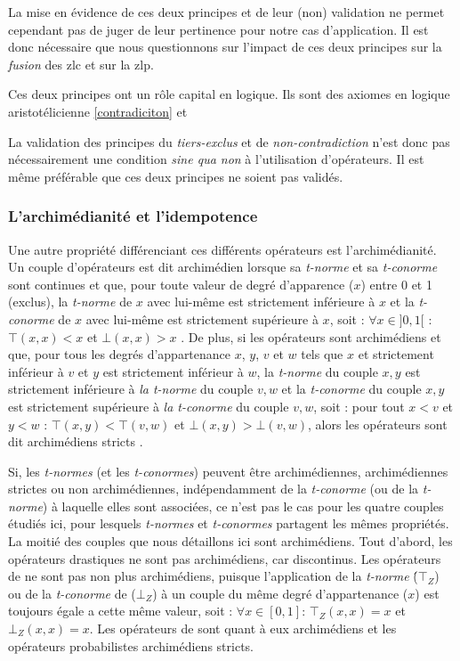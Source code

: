 La mise en évidence de ces deux principes et de leur (non) validation
ne permet cependant pas de juger de leur pertinence pour notre cas
d’application. Il est donc nécessaire que nous questionnons sur
l'impact de ces deux principes sur la \emph{fusion} des \ac{zlc} et
sur la \ac{zlp}.

Ces deux principes ont un rôle capital en logique. Ils sont des
axiomes en logique aristotélicienne \autoref{contradiciton} et 

La validation des principes du \emph{tiers-exclus} et de
\emph{non-contradiction} n'est donc pas nécessairement une condition
\emph{sine qua non} à l'utilisation d'opérateurs. Il est même
préférable que ces deux principes ne soient pas validés.

\subsubsection{L'archimédianité et l’idempotence}

Une autre propriété différenciant ces différents opérateurs est
l'archimédianité. Un couple d'opérateurs est dit archimédien lorsque
sa \emph{t-norme} et sa \emph{t-conorme} sont continues et que, pour
toute valeur de degré d’apparence (\(x\)) entre 0 et 1 (exclus), la
\emph{t-norme} de \(x\) avec lui-même est strictement inférieure à
\(x\) et la \emph{t-conorme} de \(x\) avec lui-même est strictement
supérieure à \(x\), soit : \(\forall x \in ]0,1[\) : \(⊤(x,x) < x\) et
\(⊥(x,x) > x\) \autocite{Bouchon-Meunier1995}. De plus, si les
opérateurs sont archimédiens et que, pour tous les degrés
d'appartenance \(x\), \(y\), \(v\) et \(w\) tels que \(x\) et
strictement inférieur à \(v\) et \(y\) est strictement inférieur à
\(w\), la \emph{t-norme} du couple \(x,y\) est strictement inférieure
à \emph{la t-norme} du couple \(v, w\) et la \emph{t-conorme} du
couple \(x,y\) est strictement supérieure à \emph{la t-conorme} du
couple \(v, w\), soit : pour tout \(x < v\) et \(y < w\) :
\(⊤(x,y) < ⊤(v,w)\) et \(⊥(x,y) > ⊥(v,w)\), alors les opérateurs sont
dit archimédiens stricts \autocite{Bouchon-Meunier1995}.

Si, les \emph{t-normes} (et les \emph{t-conormes}) peuvent être
archimédiennes, archimédiennes strictes ou non archimédiennes,
indépendamment de la \emph{t-conorme} (ou de la \emph{t-norme}) à
laquelle elles sont associées, ce n'est pas le cas pour les quatre
couples étudiés ici, pour lesquels \emph{t-normes} et
\emph{t-conormes} partagent les mêmes propriétés. La moitié des
couples que nous détaillons ici sont archimédiens. Tout d'abord, les
opérateurs drastiques ne sont pas archimédiens, car discontinus. Les
opérateurs de \textcite{Zadeh1965} ne sont pas non plus archimédiens,
puisque l’application de la \emph{t-norme} (́\(⊤_Z\)) ou de la
\emph{t-conorme} de  (\(⊥_Z\)) à un couple du même degré
d'appartenance (\(x\)) est toujours égale a cette même valeur, soit :
\(∀ x ∈ [0,1]\): \(⊤_Z(x,x) = x\) et \(⊥_Z(x,x) = x\).
%
Les opérateurs de  sont quant à eux archimédiens et
les opérateurs probabilistes archimédiens stricts.

